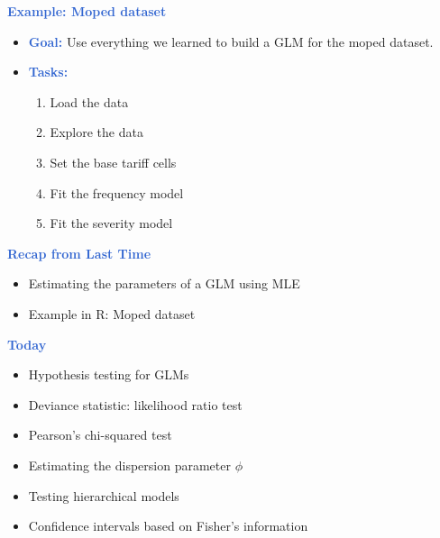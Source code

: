 \documentclass[aspectratio=169,professionalfonts,mathserif,handout]{beamer}
\newcommand{\highlight}[1]{\textcolor{Highlight}{\bf #1}}
\renewcommand{\(}{\left(}
\renewcommand{\)}{\right)}
\renewcommand{\[}{\left[}
\renewcommand{\]}{\right]}
\newcommand{\mytitle}[1]{\vspace*{-1mm}%
  \centerline{\highlight{\Large #1}}\vspace*{3mm}}
\newenvironment{slidebox}{%
  \begin{minipage}[c][7.5cm][t]{14.4cm}\raggedright}{%
  \end{minipage}}
\begin{document}
\begin{frame}\begin{slidebox}
  \mytitle{Example: Moped dataset}
  
  \begin{itemize}
      \item \highlight{Goal:} Use everything we learned to build a GLM for the moped dataset.
      \pause
      \item \highlight{Tasks:}
      \begin{enumerate}
        \item Load the data
        \pause
        \item Explore the data
        \pause
        \item Set the base tariff cells
        \pause
        \item Fit the frequency model
        \pause
        \item Fit the severity model
      \end{enumerate}
  \end{itemize}
\end{slidebox}\end{frame}

\begin{frame}\begin{slidebox}
  \mytitle{Recap from Last Time}
  
  \begin{itemize}
      \item   Estimating the parameters of a GLM using MLE
      \pause
      \item   Example in R: Moped dataset
  \end{itemize}
\end{slidebox}\end{frame}

\begin{frame}\begin{slidebox}
  \mytitle{Today}
  
  \begin{itemize}
      \item Hypothesis testing for GLMs
      \pause
      \item Deviance statistic: likelihood ratio test 
      \pause
      \item Pearson's chi-squared test
      \pause
      \item Estimating the dispersion parameter $\phi$
      \pause
      \item Testing hierarchical models
      \pause
      \item Confidence intervals based on Fisher's information
  \end{itemize}
\end{slidebox}\end{frame}
\end{document}
